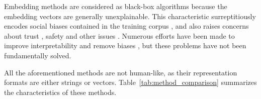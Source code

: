 Embedding methods are considered as black-box algorithms because the embedding vectors are generally unexplainable. This characteristic surreptitiously encodes social biases contained in the training corpus \citep{conf/nips/BolukbasiCZSK16, Caliskan_2017, Brunet2018Understanding, Nadeem2021StereoSet}, and also raises concerns about trust \citep{Ribeiro2016why, conf/acl/RibeiroWGS20}, safety \citep{conf/naacl/BelinkovG19, conf/emnlp/PerezHSCRAGMI22} and other issues \citep{Bender2021On}. Numerous efforts have been made to improve interpretability \citep{conf/emnlp/JainBMMW18, conf/ijcnlp/LiaoLHL20} and remove biases \citep{conf/naacl/GonenG19, conf/ltedi/GiraZL22}, but these problems have not been fundamentally solved. 

All the aforementioned methods are not human-like, as their representation formats are either strings or vectors. Table~\ref{tab:method_comparison} summarizes the characteristics of these methods. 



    





